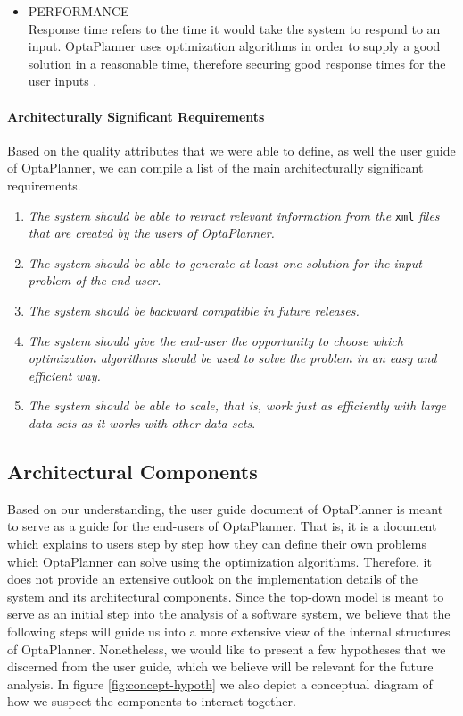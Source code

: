 \begin{itemize}
    \item {\scriptsize\MakeUppercase{Performance}}\\
    Response time refers to the time it would take the system to respond to an input. OptaPlanner uses optimization algorithms in order to supply a good solution in a reasonable time, therefore securing good response times for the user inputs \cite{userguide}.
\end{itemize}
\paragraph{Architecturally Significant Requirements}
\label{par:asrs}
Based on the quality attributes that we were able to define, as well the user guide of OptaPlanner, we can compile a list of the main architecturally significant requirements. 
\begin{enumerate}
    \item \textit{The system should be able to retract relevant information from the} \verb!xml! \textit{files that are created by the users of OptaPlanner.}
    \item \textit{The system should be able to generate at least one solution for the input problem of the end-user.}
    \item \textit{The system should be backward compatible in future releases.}
    \item \textit{The system should give the end-user the opportunity to choose which optimization algorithms should be used to solve the problem in an easy and efficient way.}
    \item \textit{The system should be able to scale, that is, work just as efficiently with large data sets as it works with other data sets}.
\end{enumerate}
\subsection{Architectural Components}
\label{subsec:arch-comp}
Based on our understanding, the user guide document of OptaPlanner is meant to serve as a guide for the end-users of OptaPlanner. That is, it is a document which explains to users step by step how they can define their own problems which OptaPlanner can solve using the optimization algorithms. Therefore, it does not provide an extensive outlook on the implementation details of the system and its architectural components. Since the top-down model is meant to serve as an initial step into the analysis of a software system, we believe that the following steps will guide us into a more extensive view of the internal structures of OptaPlanner. 
Nonetheless, we would like to present a few hypotheses that we discerned from the user guide, which we believe will be relevant for the future analysis. In figure \ref{fig:concept-hypoth} we also depict a conceptual diagram of how we suspect the components to interact together.
